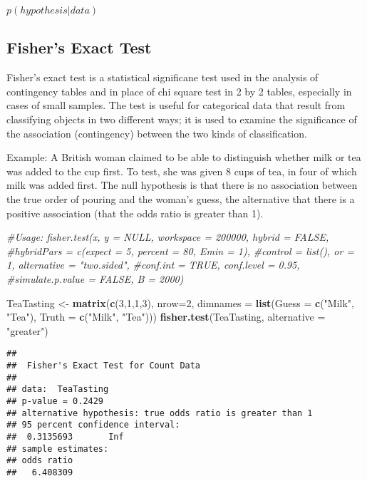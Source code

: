 \documentclass[]{article}
\newenvironment{Shaded}{\begin{snugshade}}{\end{snugshade}}
\newcommand{\CommentTok}[1]{\textcolor[rgb]{0.56,0.35,0.01}{\textit{#1}}}
\newcommand{\DataTypeTok}[1]{\textcolor[rgb]{0.13,0.29,0.53}{#1}}
\newcommand{\DecValTok}[1]{\textcolor[rgb]{0.00,0.00,0.81}{#1}}
\newcommand{\KeywordTok}[1]{\textcolor[rgb]{0.13,0.29,0.53}{\textbf{#1}}}
\newcommand{\NormalTok}[1]{#1}
\newcommand{\StringTok}[1]{\textcolor[rgb]{0.31,0.60,0.02}{#1}}
\begin{document}
\(p(hypothesis|data)\)

\hypertarget{fishers-exact-test}{%
\subsection{Fisher's Exact Test}\label{fishers-exact-test}}

Fisher's exact test is a statistical significane test used in the
analysis of contingency tables and in place of chi square test in 2 by 2
tables, especially in cases of small samples. The test is useful for
categorical data that result from classifying objects in two different
ways; it is used to examine the significance of the association
(contingency) between the two kinds of classification.

Example: A British woman claimed to be able to distinguish whether milk
or tea was added to the cup first. To test, she was given 8 cups of tea,
in four of which milk was added first. The null hypothesis is that there
is no association between the true order of pouring and the woman's
guess, the alternative that there is a positive association (that the
odds ratio is greater than 1).

\begin{Shaded}
\begin{Highlighting}[]
\CommentTok{#Usage: fisher.test(x, y = NULL, workspace = 200000, hybrid = FALSE,}
            \CommentTok{#hybridPars = c(expect = 5, percent = 80, Emin = 1),}
            \CommentTok{#control = list(), or = 1, alternative = "two.sided",}
            \CommentTok{#conf.int = TRUE, conf.level = 0.95,}
            \CommentTok{#simulate.p.value = FALSE, B = 2000)}

\NormalTok{TeaTasting <-}
\StringTok{  }\KeywordTok{matrix}\NormalTok{(}\KeywordTok{c}\NormalTok{(}\DecValTok{3}\NormalTok{,}\DecValTok{1}\NormalTok{,}\DecValTok{1}\NormalTok{,}\DecValTok{3}\NormalTok{), }
         \DataTypeTok{nrow=}\DecValTok{2}\NormalTok{, }
         \DataTypeTok{dimnames =} \KeywordTok{list}\NormalTok{(}\DataTypeTok{Guess =} \KeywordTok{c}\NormalTok{(}\StringTok{"Milk"}\NormalTok{, }\StringTok{"Tea"}\NormalTok{), }
                         \DataTypeTok{Truth =} \KeywordTok{c}\NormalTok{(}\StringTok{"Milk"}\NormalTok{, }\StringTok{"Tea"}\NormalTok{)))}
\KeywordTok{fisher.test}\NormalTok{(TeaTasting, }\DataTypeTok{alternative =} \StringTok{"greater"}\NormalTok{)}
\end{Highlighting}
\end{Shaded}

\begin{verbatim}
## 
##  Fisher's Exact Test for Count Data
## 
## data:  TeaTasting
## p-value = 0.2429
## alternative hypothesis: true odds ratio is greater than 1
## 95 percent confidence interval:
##  0.3135693       Inf
## sample estimates:
## odds ratio 
##   6.408309
\end{verbatim}
\end{document}
